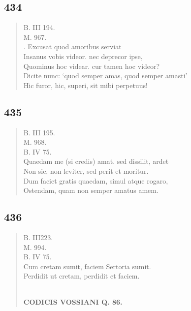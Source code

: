 \documentclass[11pt, a4paper]{report}
\begin{document}
            \subsection*{434}
      \begin{verse}
      B. III 194. \\ M. 967. \\ . Excusat quod amoribus serviat \\ Insanus vobis videor. nec deprecor ipse, \\ Quominus hoc videar. cur tamen hoc videor? \\ Dicite nunc: ‘quod semper amas, quod semper amasti’ \\ Hic furor, hic, superi, sit mibi perpetuus! \\ 
      \end{verse}
  
            \subsection*{435}
      \begin{verse}
      B. III 195. \\ M. 968. \\ B. IV 75. \\ Quaedam me (si credis) amat. sed dissilit, ardet \\ Non sic, non leviter, sed perit et moritur. \\ Dum faciet gratis quaedam, simul atque rogaro, \\ Ostendam, quam non semper amatus amem. \\ 
      \end{verse}
  
            \subsection*{436}
      \begin{verse}
      B. III223. \\ M. 994. \\ B. IV 75. \\ Cum cretam sumit, faciem Sertoria sumit. \\ Perdidit  \lbrack ut \rbrack  cretam, perdidit et faciem. \\ 
        ﻿\pagebreak 
    \begin{center} \textbf{CODICIS VOSSIANI Q. 86.} \end{center} \marginpar{[331]} 
      \end{verse}
  
\end{document}
